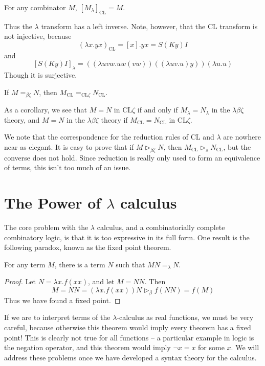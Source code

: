 \begin{lemma}
    For any combinator $M$, $[M_\lambda]_{\text{CL}} = M$.
\end{lemma}

Thus the $\lambda$ transform has a left inverse. Note, however, that the $\text{CL}$ transform is not injective, because
%
\[ (\lambda x.yx)_{\text{CL}} = [x].yx = S(Ky)I \]
%
and
%
\[ [S(Ky)I]_\lambda = ((\lambda uvw.uw(vw)) ((\lambda uv.u)y))(\lambda u.u) \]
%
Though it is surjective.

\begin{lemma}
    If $M =_{\beta \zeta} N$, then $M_{\text{CL}} =_{\text{CL} \zeta} N_{\text{CL}}$.
\end{lemma}

As a corollary, we see that $M = N$ in $\text{CL} \zeta$ if and only if $M_\lambda = N_\lambda$ in the $\lambda \beta \zeta$ theory, and $M = N$ in the $\lambda \beta \zeta$ theory if $M_{\text{CL}} = N_{\text{CL}}$ in $\text{CL} \zeta$.

We note that the correspondence for the reduction rules of $\text{CL}$ and $\lambda$ are nowhere near as elegant. It is easy to prove that if $M \rhd_{\beta \zeta} N$, then $M_{\text{CL}} \rhd_s N_{\text{CL}}$, but the converse does not hold. Since reduction is really only used to form an equivalence of terms, this isn't too much of an issue.

\section{The Power of $\lambda$ calculus}

The core problem with the $\lambda$ calculus, and a combinatorially complete combinatory logic, is that it is too expressive in its full form. One result is the following paradox, known as the fixed point theorem.

\begin{theorem}
    For any term $M$, there is a term $N$ such that $MN =_\lambda N$.
\end{theorem}
\begin{proof}
    Let $N = \lambda x.f(xx)$, and let $M = NN$. Then
    \[ M = NN = (\lambda x.f(xx)) N \rhd_\beta f(NN) = f(M) \]
    Thus we have found a fixed point.
\end{proof}

If we are to interpret terms of the $\lambda$-calculus as real functions, we must be very careful, because otherwise this theorem would imply every theorem has a fixed point! This is clearly not true for all functions -- a particular example in logic is the negation operator, and this theorem would imply $\neg x = x$ for some $x$. We will address these problems once we have developed a syntax theory for the calculus.

